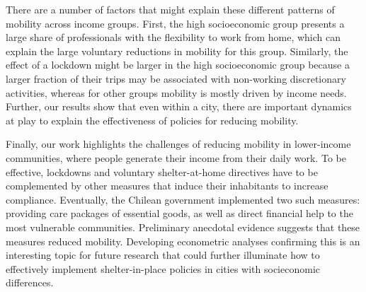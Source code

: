 There are a number of factors that might explain these different patterns of mobility across income groups. First, the high socioeconomic group presents a large share of professionals with the flexibility to work from home,  which can explain the large voluntary reductions in mobility for this group. Similarly, the effect of a lockdown might be larger in the high socioeconomic group because a larger fraction of their trips may be associated with non-working discretionary activities, whereas for other groups mobility is mostly driven by income needs. Further, our results show that even within a city, there are important dynamics at play to explain the effectiveness of policies for reducing mobility. %

Finally, our work highlights the challenges of reducing mobility in lower-income communities, where people generate their income from their daily work. To be effective, lockdowns and voluntary shelter-at-home directives have to be complemented by other measures that induce their inhabitants to increase compliance. Eventually, the Chilean government implemented two such measures: providing care packages of essential goods, as well as direct financial help to the most vulnerable communities. Preliminary anecdotal evidence suggests that these measures reduced mobility. Developing econometric analyses confirming this is an interesting topic for future research that could further illuminate how to effectively implement shelter-in-place policies in cities with socieconomic differences.


